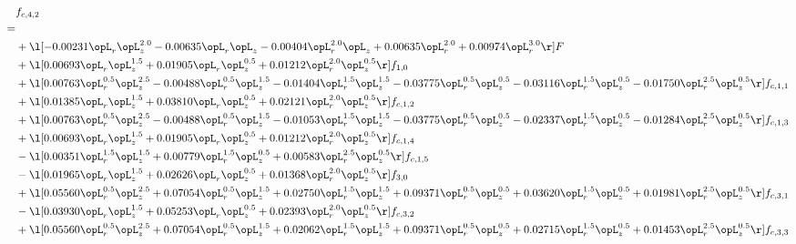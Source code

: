 \begin{alignat}{2} 
\label{eq:f_42_1} 
& f_{c,4,2} \nonumber \\ 
 = \\ 
& + \l[  -0.00231 \opL_r \opL_z^{2.0}   -0.00635 \opL_r \opL_z   -0.00404 \opL_r^{2.0} \opL_z +  0.00635 \opL_r^{2.0} +  0.00974 \opL_r^{3.0}  \r] F \nonumber \\ 
& + \l[  0.00693 \opL_r \opL_z^{1.5} +  0.01905 \opL_r \opL_z^{0.5} +  0.01212 \opL_r^{2.0} \opL_z^{0.5}  \r] f_{1,0} \nonumber \\ 
& + \l[  0.00763 \opL_r^{0.5} \opL_z^{2.5}   -0.00488 \opL_r^{0.5} \opL_z^{1.5}   -0.01404 \opL_r^{1.5} \opL_z^{1.5}   -0.03775 \opL_r^{0.5} \opL_z^{0.5}   -0.03116 \opL_r^{1.5} \opL_z^{0.5}   -0.01750 \opL_r^{2.5} \opL_z^{0.5}  \r] f_{c,1,1} \nonumber \\ 
& + \l[  0.01385 \opL_r \opL_z^{1.5} +  0.03810 \opL_r \opL_z^{0.5} +  0.02121 \opL_r^{2.0} \opL_z^{0.5}  \r] f_{c,1,2} \nonumber \\ 
& + \l[  0.00763 \opL_r^{0.5} \opL_z^{2.5}   -0.00488 \opL_r^{0.5} \opL_z^{1.5}   -0.01053 \opL_r^{1.5} \opL_z^{1.5}   -0.03775 \opL_r^{0.5} \opL_z^{0.5}   -0.02337 \opL_r^{1.5} \opL_z^{0.5}   -0.01284 \opL_r^{2.5} \opL_z^{0.5}  \r] f_{c,1,3} \nonumber \\ 
& + \l[  0.00693 \opL_r \opL_z^{1.5} +  0.01905 \opL_r \opL_z^{0.5} +  0.01212 \opL_r^{2.0} \opL_z^{0.5}  \r] f_{c,1,4} \nonumber \\ 
& - \l[  0.00351 \opL_r^{1.5} \opL_z^{1.5} +  0.00779 \opL_r^{1.5} \opL_z^{0.5} +  0.00583 \opL_r^{2.5} \opL_z^{0.5}  \r] f_{c,1,5} \nonumber \\ 
& - \l[  0.01965 \opL_r \opL_z^{1.5} +  0.02626 \opL_r \opL_z^{0.5} +  0.01368 \opL_r^{2.0} \opL_z^{0.5}  \r] f_{3,0} \nonumber \\ 
& + \l[  0.05560 \opL_r^{0.5} \opL_z^{2.5} +  0.07054 \opL_r^{0.5} \opL_z^{1.5} +  0.02750 \opL_r^{1.5} \opL_z^{1.5} +  0.09371 \opL_r^{0.5} \opL_z^{0.5} +  0.03620 \opL_r^{1.5} \opL_z^{0.5} +  0.01981 \opL_r^{2.5} \opL_z^{0.5}  \r] f_{c,3,1} \nonumber \\ 
& - \l[  0.03930 \opL_r \opL_z^{1.5} +  0.05253 \opL_r \opL_z^{0.5} +  0.02393 \opL_r^{2.0} \opL_z^{0.5}  \r] f_{c,3,2} \nonumber \\ 
& + \l[  0.05560 \opL_r^{0.5} \opL_z^{2.5} +  0.07054 \opL_r^{0.5} \opL_z^{1.5} +  0.02062 \opL_r^{1.5} \opL_z^{1.5} +  0.09371 \opL_r^{0.5} \opL_z^{0.5} +  0.02715 \opL_r^{1.5} \opL_z^{0.5} +  0.01453 \opL_r^{2.5} \opL_z^{0.5}  \r] f_{c,3,3} \nonumber \\ 

\end{alignat}
